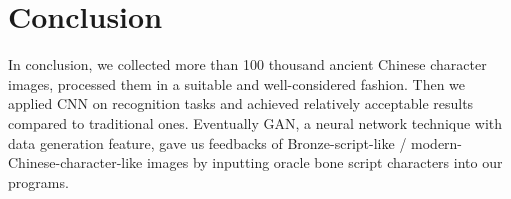 \chapter{Conclusion}
In conclusion, we collected more than 100 thousand ancient Chinese character images, processed them in a suitable and well-considered fashion. Then we applied CNN on recognition tasks and achieved relatively acceptable results compared to traditional ones. Eventually GAN, a neural network technique with data generation feature, gave us feedbacks of Bronze-script-like / modern-Chinese-character-like images by inputting oracle bone script characters into our programs.